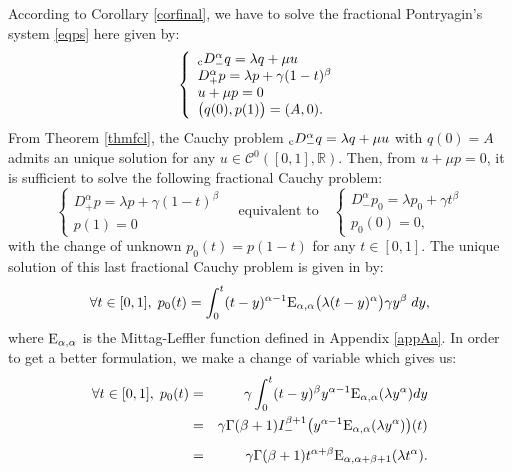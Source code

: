 \documentclass[english,11pt,reqno]{smfart}
\def\di{\displaystyle}
\newcommand{\R}{\mathbb{R}}
\newcommand{\CC}{\mathscr{C}}
\newcommand{\cDM}{{}_{{\rm c}} D^\alpha_-}
\newcommand{\DM}{D^\alpha_-}
\newcommand{\DP}{D^\alpha_+}
\begin{document}
According to Corollary \ref{corfinal}, we have to solve the fractional Pontryagin's system \eqref{eqps} here given by:
\begin{equation}
 \left\lbrace \begin{array}{l}
 		\cDM q = \lambda q + \mu u \\
 		\DP p = \lambda p + \gamma (1-t)^\beta \\
	    u + \mu p = 0 \\
	    \big( q(0),p(1) \big) = ( A,0 ).
        \end{array}
\right.
\end{equation}
From Theorem \ref{thmfcl}, the Cauchy problem $\cDM q = \lambda q + \mu u $ with $q(0)=A $ admits an unique solution for any $u \in \CC^0([0,1],\R)$. Then, from $u + \mu p = 0$, it is sufficient to solve the following fractional Cauchy problem:
\begin{equation}
 \left\lbrace \begin{array}{l}
 		\DP p = \lambda p + \gamma (1-t)^\beta \\
	    p(1) = 0
        \end{array}
\right. \quad \text{equivalent to} \quad \left\lbrace \begin{array}{l}
 		\DM p_0 = \lambda p_0 + \gamma t^\beta \\
	    p_0(0) = 0,
        \end{array}
\right.
\end{equation}
with the change of unknown $p_0(t) = p(1-t) $ for any $t \in [0,1]$. The unique solution of this last fractional Cauchy problem is given in \cite[Chap.3, p.137]{kilb} by:
\begin{equation}
\forall t \in [0,1], \;  p_0 (t) = \di \int_0^t (t-y)^{\alpha-1} {\rm E}_{\alpha,\alpha} \big( \lambda (t-y)^\alpha \big) \gamma y^\beta \; dy,
\end{equation}
where ${\rm E}_{\alpha,\alpha}$ is the Mittag-Leffler function defined in Appendix \ref{appAa}. In order to get a better formulation, we make a change of variable which gives us:
\begin{eqnarray}
\forall t \in [0,1], \;  p_0 (t) & = & \gamma \di \int_0^t (t-y)^{\beta} y^{\alpha-1} {\rm E}_{\alpha,\alpha} ( \lambda y^\alpha ) dy \\
& = & \gamma \Gamma (\beta +1) I^{\beta +1}_- \big( y^{\alpha-1} {\rm E}_{\alpha,\alpha} ( \lambda y^\alpha ) \big) (t) \\[5pt]
& = & \gamma \Gamma (\beta +1) t^{\alpha+\beta} {\rm E}_{\alpha,\alpha+\beta+1} ( \lambda t^\alpha ).
\end{eqnarray}
\end{document}
